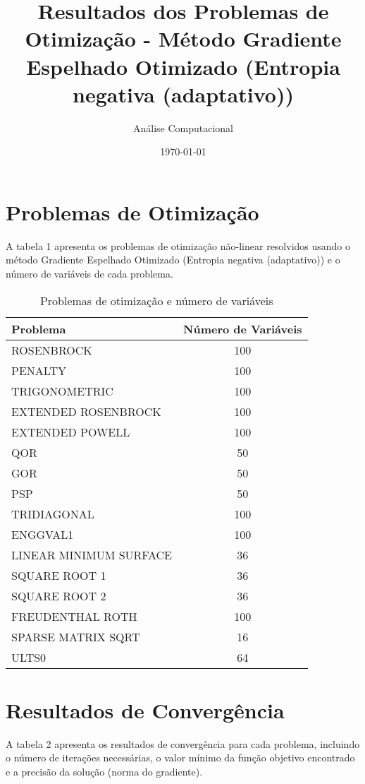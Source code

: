 \documentclass[12pt]{article}
\title{Resultados dos Problemas de Otimização - Método Gradiente Espelhado Otimizado (Entropia negativa (adaptativo))}
\author{Análise Computacional}
\date{\today}
\begin{document}
\maketitle

\section{Problemas de Otimização}

A tabela 1 apresenta os problemas de otimização não-linear resolvidos usando o método Gradiente Espelhado Otimizado (Entropia negativa (adaptativo)) e o número de variáveis de cada problema.

\begin{table}[h!]
\centering
\caption{Problemas de otimização e número de variáveis}
\label{tab:problemas_variáveis}
\begin{tabular}{@{}|lc|@{}}
\toprule
\textbf{Problema} & \textbf{Número de Variáveis} \\
\midrule
ROSENBROCK & 100 \\
PENALTY & 100 \\
TRIGONOMETRIC & 100 \\
EXTENDED ROSENBROCK & 100 \\
EXTENDED POWELL & 100 \\
QOR & 50 \\
GOR & 50 \\
PSP & 50 \\
TRIDIAGONAL & 100 \\
ENGGVAL1 & 100 \\
LINEAR MINIMUM SURFACE & 36 \\
SQUARE ROOT 1 & 36 \\
SQUARE ROOT 2 & 36 \\
FREUDENTHAL ROTH & 100 \\
SPARSE MATRIX SQRT & 16 \\
ULTS0 & 64 \\
\bottomrule
\end{tabular}
\end{table}

\section{Resultados de Convergência}

A tabela 2 apresenta os resultados de convergência para cada problema, incluindo o número de iterações necessárias, o valor mínimo da função objetivo encontrado e a precisão da solução (norma do gradiente).
\end{document}
